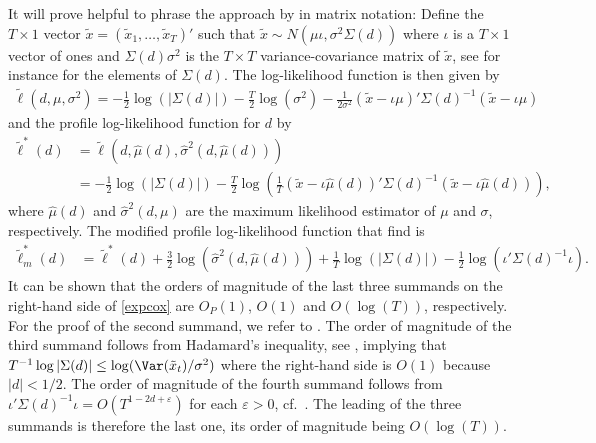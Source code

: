 {{It will prove helpful to phrase the approach by \textcite{an1993cox} in matrix notation: Define the $T \times 1$ vector $\tilde{x} = (\tilde{x}_1,\ldots,\tilde{x}_T)'$ such that $\tilde{x} \sim N(\mu \iota, \sigma^2 \Sigma(d))$ where
$\iota$ is a $T\times1$ vector of ones and $\Sigma(d) \sigma^2$ is the $T \times T$ variance-covariance matrix of $\tilde{x}$, see for instance \textcite[Theorem 1]{hoskingdiff1981} for the
elements of $\Sigma(d)$. The log-likelihood function is then given by
\begin{align}
    \tilde{\ell}(d,\mu,\sigma^2) = -\frac{1}{2}  \log( |\Sigma(d)| ) -\frac{T}{2}  \log( \sigma^2)  - \frac{1}{2 \sigma^2} \left(  \tilde{x}  - \iota \mu\right)' \Sigma(d)^{-1} \left(  \tilde{x}  - \iota \mu\right) \label{philipslieberman}
\end{align}
and the profile log-likelihood function for $d$ by
\begin{align*}
     \tilde{\ell}^*(d) &=  \tilde{\ell}(d,\hat{\mu}(d),\hat{\sigma}^2(d,\hat{\mu}(d))) \\
           &= -\frac{1}{2}  \log( |\Sigma(d)| ) - \frac{T}{2}  \log \left( \frac{1}{T} \left(  \tilde{x}  - \iota \hat \mu (d) \right)' \Sigma(d)^{-1} \left(  \tilde{x}  - \iota \hat \mu (d) \right) \right) ,
\end{align*}
where $\hat{\mu}(d)$ and $\hat{\sigma}^2(d,\mu)$ are the maximum likelihood estimator of $\mu$ and $\sigma$, respectively. The modified profile log-likelihood function that \textcite{an1993cox} find is
\begin{align}
    \tilde{\ell}^*_m(d) &=  \tilde{\ell}^*(d)  + \frac{3}{2} \log \left( \hat{\sigma}^2(d,\hat{\mu}(d)) \right) + \frac{1}{T} \log( |\Sigma(d)|) - \frac{1}{2} \log\left(   \iota' \Sigma(d)^{-1} \iota \right). \label{expcox}
\end{align}
It can be shown that the orders of magnitude of the last three summands on the right-hand side of \eqref{expcox} are $O_P(1)$, $O(1)$ and $ O(\log(T))$, respectively. For the proof of the second summand, we refer to
\textcite{dahlhaus1989efficient}. The order of magnitude of the third summand follows from Hadamard's inequality, see \textcite[Theorem 7.8.1]{horn2013matrix}, implying that
$T^{-1} \log |\Sigma(d)| \leq \log( \Var(\tilde{x}_t)/\sigma^2 )$ where the right-hand side is $O(1)$ because $|d| < 1/2$. The order of magnitude of the fourth summand follows from $\iota' \Sigma(d)^{-1} \iota = O(T^{1-2d+\varepsilon})$ for each $\varepsilon > 0$, cf.\ \textcite[Theorem 5.2]{adenstedt1974large}. The leading of the three summands
is therefore the last one, its  order of magnitude being $O(\log(T))$. 

}}
